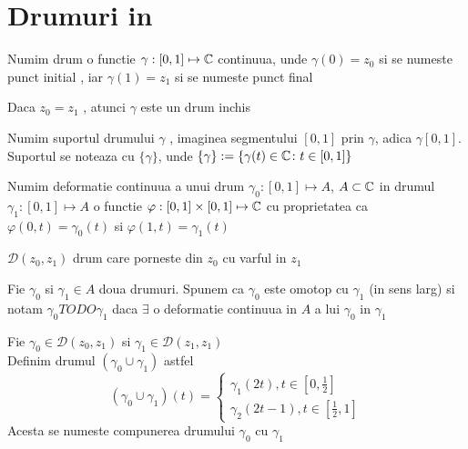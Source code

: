 \section{Drumuri in \C}

\begin{definition}
    Numim drum o functie $\gamma : [0,1] \mapsto \mathbb{C}$ continuua,
    unde $\gamma(0)=z_0$ si se numeste punct initial ,
    iar $\gamma(1)=z_1$ si se numeste punct final
\end{definition}

\begin{observation}
    Daca $z_0=z_1$ , atunci $\gamma$ este un drum inchis
\end{observation}

\begin{definition}
    Numim suportul drumului $\gamma$ , imaginea segmentului $[0,1]$ prin $\gamma$,
    adica $\gamma[0,1]$. Suportul se noteaza cu $\{\gamma\}$, unde
    $\{\gamma\} := \{\gamma(t) \in \mathbb{C} \colon t\in [0,1]\}$
\end{definition}

\begin{definition}
    Numim deformatie continuua a unui drum $\gamma_0:[0,1]\mapsto A$, $A\subset\mathbb{C}$
    in drumul $\gamma_1:[0,1]\mapsto A$ o functie $\varphi:[0,1]\times[0,1]\mapsto \mathbb{C}$
    cu proprietatea ca $\varphi(0, t) = \gamma_0(t)$ si $\varphi(1, t)=\gamma_1(t)$
\end{definition}

\begin{notation}
    $\mathcal{D}(z_0,z_1)$ drum care porneste din $z_0$ cu varful in $z_1$
\end{notation}

\begin{definition}
    Fie $\gamma_0$ si $\gamma_1 \in A$ doua drumuri. Spunem ca $\gamma_0$ este omotop
    cu $\gamma_1$ (in sens larg) si notam $\gamma_0 TODO \gamma_1$ daca $\exists$ o
    deformatie continuua in $A$ a lui $\gamma_0$ in $\gamma_1$
\end{definition}

\begin{definition}
    Fie $\gamma_0 \in \mathcal{D}(z_0, z_1)$ si $\gamma_1 \in \mathcal{D}(z_1, z_1)$ \\
    Definim drumul $(\gamma_0 \cup \gamma_1)$ astfel
    \[
        (\gamma_0 \cup \gamma_1)(t) =
        \left \{
		    \begin{aligned}
                \gamma_1(2t), t \in \left[0,\frac{1}{2}\right] \\
                \gamma_2(2t-1), t \in \left[\frac{1}{2},1\right]
	       	\end{aligned}
        \right .
    \]
    Acesta se numeste compunerea drumului $\gamma_0$ cu $\gamma_1$
\end{definition}


